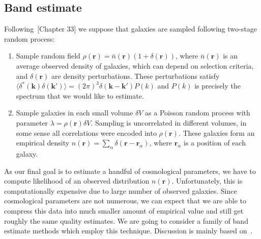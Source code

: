 \documentclass[12pt]{extarticle}
\numberwithin{problem}{section}
\numberwithin{theorem}{section}
\begin{document}
	\subsection{Band estimate}
	Following~\cite{peebles:1980}[Chapter 33] we suppose that galaxies are sampled following two-stage random process:
	\begin{enumerate}
		\item Sample random field $\rho(\mathbf{r}) = \bar{n}(\mathbf{r})(1 + \delta(\mathbf{r}))$, where $\bar{n}(\mathbf{r})$ is an average observed density of galaxies, which can depend on selection criteria, and $\delta(\mathbf{r})$ are density perturbations. These perturbations satisfy $\langle\delta^*(\mathbf{k})\delta(\mathbf{k}')\rangle = (2\pi)^3\delta(\mathbf{k}-\mathbf{k}')P(k)$ and $P(k)$ is precisely the spectrum that we would like to estimate.
		\item Sample galaxies in each small volume $\delta V$ as a Poisson random process with parameter $\lambda=\rho(\mathbf{r})\delta V$. Sampling is uncorrelated in different volumes, in some sense all correlations were encoded into $\rho(\mathbf{r})$. These galaxies form an empirical density $n(\mathbf{r}) = \sum_\alpha \delta(\mathbf{r} - \mathbf{r}_\alpha)$, where $\mathbf{r}_\alpha$ is a position of each galaxy.
	\end{enumerate}
	
	As our final goal is to estimate a handful of cosmological parameters, we have to compute likelihood of an observed distribution $n(\mathbf{r})$. Unfortunately, this is computationally expensive due to large number of observed galaxies. Since cosmological parameters are not numerous, we can expect that we are able to compress this data into much smaller amount of empirical value and still get roughly the same quality estimates. We are going to consider a family of band estimate methods which employ this technique. Discussion is mainly based on~\cite{tegmark:1998}.
	
\end{document}
